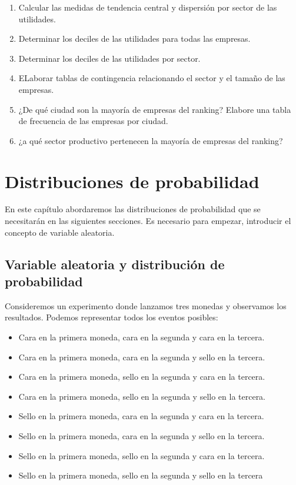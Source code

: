 \documentclass[letterpaper,]{book}
\providecommand{\tightlist}{%
  \setlength{\itemsep}{0pt}\setlength{\parskip}{0pt}}
\begin{document}
\begin{enumerate}
\begin{enumerate}
    \begin{enumerate}
    \def\labelenumiii{\arabic{enumiii}.}
    \tightlist
    \item
      Calcular las medidas de tendencia central y dispersión por sector de las utilidades.
    \item
      Determinar los deciles de las utilidades para todas las empresas.
    \item
      Determinar los deciles de las utilidades por sector.
    \item
      ELaborar tablas de contingencia relacionando el sector y el tamaño de las empresas.
    \item
      ¿De qué ciudad son la mayoría de empresas del ranking? Elabore una tabla de frecuencia de las empresas por ciudad.
    \item
      ¿a qué sector productivo pertenecen la mayoría de empresas del ranking?
    \end{enumerate}
  \end{enumerate}
\end{enumerate}

\hypertarget{distr}{%
\chapter{Distribuciones de probabilidad}\label{distr}}

En este capítulo abordaremos las distribuciones de probabilidad que se necesitarán en las siguientes secciones. Es necesario para empezar, introducir el concepto de variable aleatoria.

\hypertarget{variable-aleatoria-y-distribucion-de-probabilidad}{%
\section{Variable aleatoria y distribución de probabilidad}\label{variable-aleatoria-y-distribucion-de-probabilidad}}

Consideremos un experimento donde lanzamos tres monedas y observamos los resultados. Podemos representar todos los eventos posibles:

\begin{itemize}
\tightlist
\item
  Cara en la primera moneda, cara en la segunda y cara en la tercera.
\item
  Cara en la primera moneda, cara en la segunda y sello en la tercera.
\item
  Cara en la primera moneda, sello en la segunda y cara en la tercera.
\item
  Cara en la primera moneda, sello en la segunda y sello en la tercera.
\item
  Sello en la primera moneda, cara en la segunda y cara en la tercera.
\item
  Sello en la primera moneda, cara en la segunda y sello en la tercera.
\item
  Sello en la primera moneda, sello en la segunda y cara en la tercera.
\item
  Sello en la primera moneda, sello en la segunda y sello en la tercera
\end{itemize}
\end{document}
